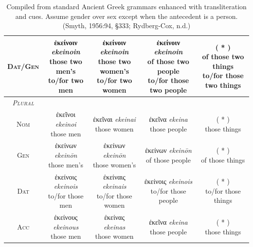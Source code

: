 \documentclass[10pt,a4paper,notitlepage]{article}
\newcommand{\tsc}[1]{\textsc{#1}}
\newcommand*{\grc}[1]{\fontspec{Inter}#1\rmfamily}
\newcommand{\trc}[1]{\textit{\fontspec{Tinos}#1}}
\begin{document}
\begin{table}[H]
\begin{tabular}{c|ccc|c}
        \tsc{Dat/Gen} & \makecell{\grc{ἐκείνοιν} \trc{ekeinoin} \\ \small those two men's\\ \small to/for two men} & \makecell{\grc{ἐκείνοιν} \trc{ekeinoin} \\ \small those two women's\\ \small to/for two women} & \makecell{\grc{ἐκείνοιν} \trc{ekeinoin} \\ \small of those two people \\ \small to/for those two people} & \makecell{( * ) \\ \small of those two things \\ \small to/for those two things} \\
        \hline
        \emph{\tsc{Plural}} & & & & \\
        \tsc{Nom} & \makecell{\grc{ἐκεῖνοι} \trc{ekeinoi} \\ \small those men} & \makecell{\grc{ἐκεῖναι} \trc{ekeinai} \\ \small those women} & \makecell{\grc{ἐκεῖνα} \trc{ekeina} \\ \small those people} & \makecell{( * ) \\ \small those things} \\
        \tsc{Gen} & \makecell{\grc{ἐκείνων} \trc{ekeinōn} \\ \small those men's} & \makecell{\grc{ἐκείνων} \trc{ekeinōn} \\ \small those women's} & \makecell{\grc{ἐκείνων} \trc{ekeinōn} \\ \small of those people} & \makecell{( * ) \\ \small of those things} \\
        \tsc{Dat} & \makecell{\grc{ἐκείνοις} \trc{ekeinois} \\ \small to/for those men} & \makecell{\grc{ἐκείναις} \trc{ekeinais}\\ \small to/for those women} & \makecell{\grc{ἐκείνοις} \trc{ekeinois} \\ \small to/for those people} & \makecell{( * ) \\ \small to/for those things} \\
        \tsc{Acc} & \makecell{\grc{ἐκείνους} \trc{ekeinous} \\ \small those men} & \makecell{\grc{ἐκείνας} \trc{ekeinas} \\ \small those women} & \makecell{\grc{ἐκεῖνα} \trc{ekeina} \\ \small those people} & \makecell{( * ) \\ \small those things} \\
    \end{tabular}
    \caption{Compiled from standard Ancient Greek grammars enhanced with transliteration and cues.
            Assume gender over sex except when the antecedent is a person.
        (Smyth, 1956:94, \S333; Rydberg-Cox, n.d.)}
\end{table}
\end{document}
